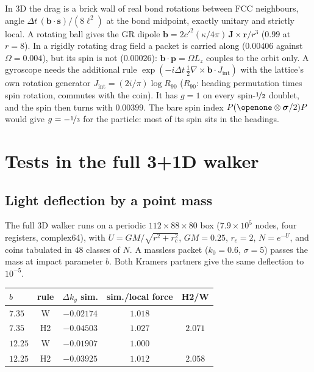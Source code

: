 \documentclass[twocolumn,showpacs,preprintnumbers,amsmath,amssymb]{revtex4-2}
\newcommand{\cpr}{c'}
\newcommand{\Jint}{J_{\mathrm{int}}}
\newcommand{\bvec}{\mathbf{b}}
\newcommand{\pvec}{\mathbf{p}}
\newcommand{\rvec}{\mathbf{r}}
\newcommand{\vsig}{\boldsymbol{\sigma}}
\begin{document}
In 3D the drag is a brick wall of real bond rotations between FCC neighbours,
angle $\Delta t\,(\bvec\cdot\mathbf{s})/(8\ell^{2})$ at the bond midpoint,
exactly unitary and strictly local.
A rotating ball gives the GR dipole $\bvec=2\cpr^{2}(\kappa/4\pi)\,\mathbf{J}\times\rvec/r^{3}$
($0.99$ at $r=8$).
In a rigidly rotating drag field a packet is carried along ($0.00406$ against
$\Omega=0.004$), but its spin is not ($0.00026$): $\bvec\cdot\pvec=\Omega L_z$
couples to the orbit only.
A gyroscope needs the additional rule
$\exp(-i\Delta t\,\tfrac12\nabla\times\bvec\cdot\Jint)$ with the lattice's own
rotation generator $\Jint=(2i/\pi)\log R_{90}$ ($R_{90}$: heading permutation
times spin rotation, commutes with the coin).
It has $g=1$ on every spin-$\nicefrac12$ doublet, and the spin then turns with
$0.00399$.
The bare spin index $P(\openone\otimes\vsig/2)P$ would give $g=-\nicefrac13$
for the particle: most of its spin sits in the headings.

\section{Tests in the full 3+1D walker}
\label{sec:3d}

\subsection{Light deflection by a point mass}

The full 3D walker runs on a periodic $112\times88\times80$ box ($7.9\times10^{5}$
nodes, four registers, complex64), with $U=GM/\sqrt{r^{2}+r_c^{2}}$,
$GM=0.25$, $r_c=2$, $N=e^{-U}$, and coins tabulated in $48$ classes of $N$.
A massless packet ($k_0=0.6$, $\sigma=5$) passes the mass at impact parameter
$b$.
Both Kramers partners give the same deflection to $10^{-5}$.

\begin{center}
\begin{tabular}{lcccc}
\toprule
$b$ & rule & $\Delta k_y$ sim. & sim./local force & H2/W\\
\midrule
$7.35$ & W & $-0.02174$ & $1.018$ & \\
$7.35$ & H2 & $-0.04503$ & $1.027$ & $\mathbf{2.071}$\\
$12.25$ & W & $-0.01907$ & $1.000$ & \\
$12.25$ & H2 & $-0.03925$ & $1.012$ & $\mathbf{2.058}$\\
\bottomrule
\end{tabular}
\end{center}
\end{document}
